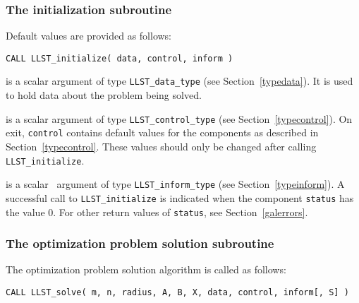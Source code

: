 \documentclass{galahad}
\newcommand{\packagename}{LLST}
\begin{document}
\subsubsection{The initialization subroutine}\label{subinit}
 Default values are provided as follows:

\hskip0.5in
{\tt CALL \packagename\_initialize( data, control, inform )}

\begin{description}

 is a scalar \intentinout argument of type
{\tt \packagename\_data\_type}
(see Section~\ref{typedata}). It is used to hold data about the problem being
solved.

 is a scalar \intentout argument of type
{\tt \packagename\_control\_type}
(see Section~\ref{typecontrol}).
On exit, {\tt control} contains default values for the components as
described in Section~\ref{typecontrol}.
These values should only be changed after calling
{\tt \packagename\_initialize}.

 is a scalar \intentout\ argument of type
{\tt \packagename\_inform\_type}
(see Section~\ref{typeinform}). A successful call to
{\tt \packagename\_initialize}
is indicated when the  component {\tt status} has the value 0.
For other return values of {\tt status}, see Section~\ref{galerrors}.

\end{description}


\subsubsection{The optimization problem solution subroutine}
The optimization problem solution algorithm is called as follows:

\hskip0.5in
{\tt CALL \packagename\_solve( m, n, radius, A, B, X, data, control, inform[, S] )}
\end{document}
